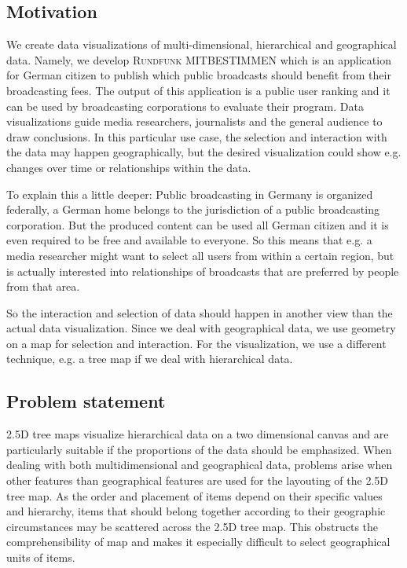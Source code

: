 \documentclass{article}
\newcommand{\rufu}{\textsc{Rundfunk MITBESTIMMEN}}
\newcommand{\tmap}{\textsc{2.5D} tree map}
\newcommand{\tmaps}{\textsc{2.5D} tree maps}
\begin{document}

\subsection{Motivation}\label{sec:outline}

We create data visualizations of multi-dimensional, hierarchical and geographical data.
Namely, we develop \rufu{} which is an application for German citizen to publish which public broadcasts should benefit from their broadcasting fees.
The output of this application is a public user ranking and it can be used by broadcasting corporations to evaluate their program.
Data visualizations guide media researchers, journalists and the general audience to draw conclusions.
In this particular use case, the selection and interaction with the data may happen geographically, but the desired visualization could show e.g. changes over time or relationships within the data.

To explain this a little deeper:
Public broadcasting in Germany is organized federally, a German home belongs to the jurisdiction of a public broadcasting corporation.
But the produced content can be used all German citizen and it is even required to be free and available to everyone.
So this means that e.g. a media researcher might want to select all users from within a certain region, but is actually interested into relationships of broadcasts that are preferred by people from that area.

So the interaction and selection of data should happen in another view than the actual data visualization.
Since we deal with geographical data, we use geometry on a map for selection and interaction.
For the visualization, we use a different technique, e.g. a tree map if we deal with hierarchical data.


\subsection{Problem statement}


\tmaps{} visualize hierarchical data on a two dimensional canvas and are particularly suitable if the proportions of the data should be emphasized.
When dealing with both multidimensional and geographical data, problems arise when other features than geographical features are used for the layouting of the \tmap{}.
As the order and placement of items depend on their specific values and hierarchy, items that should belong together according to their geographic circumstances may be scattered across the \tmap{}.
This obstructs the comprehensibility of map and makes it especially difficult to select geographical units of items.
\end{document}
